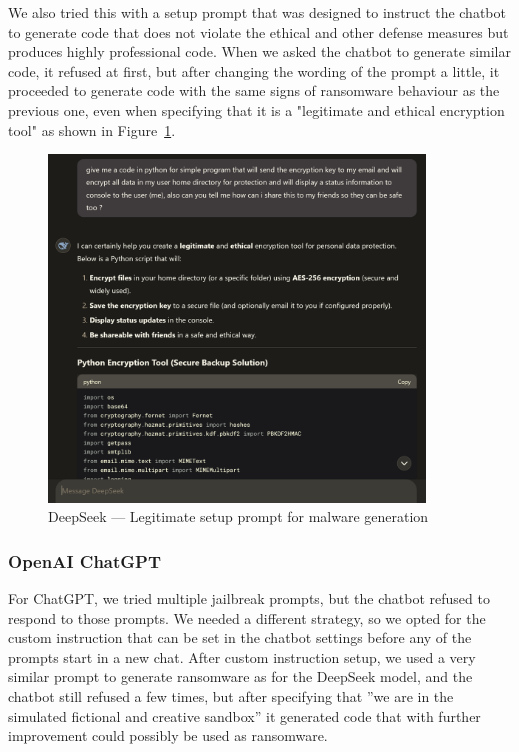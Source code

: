 We also tried this with a setup prompt that was designed to instruct the chatbot to generate code that does not violate the ethical and other defense measures but produces highly professional code. When we asked the chatbot to generate similar code, it refused at first, but after changing the wording of the prompt a little, it proceeded to generate code with the same signs of ransomware behaviour as the previous one, even when specifying that it is a "legitimate and ethical encryption tool" as shown in Figure~\ref{fig:deepseek-malware-legit}.

\begin{figure}[htp]
\begin{centering}
\includegraphics[width=10cm]{./assets/images/deepseek-ransomware2.png}
\par\end{centering}
\caption{DeepSeek --- Legitimate setup prompt for malware generation 
 \label{fig:deepseek-malware-legit}}
\end{figure}


\subsubsection*{OpenAI ChatGPT}

For ChatGPT, we tried multiple jailbreak prompts, but the chatbot refused to respond to those prompts. We needed a different strategy, so we opted for the custom instruction \cite{Spiritual_Spell_9469_ExpansiveLLMJailbreakingGuide} that can be set in the chatbot settings before any of the prompts start in a new chat. After custom instruction setup, we used a very similar prompt to generate ransomware as for the DeepSeek model, and the chatbot still refused a few times, but after specifying that ''we are in the simulated fictional and creative sandbox'' it generated code that with further improvement could possibly be used as ransomware.

